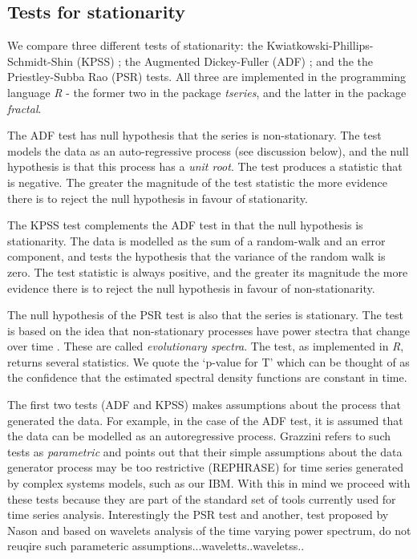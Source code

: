 \subsection{Tests for stationarity}
\label{sec:stat_tests}

We compare three different tests of stationarity: the Kwiatkowski-Phillips-Schmidt-Shin (KPSS) \cite{kwiatkowski1992testing}; the Augmented Dickey-Fuller (ADF) \cite{said1984testing}; and the the Priestley-Subba Rao (PSR) \cite{priestley1969test} tests. All three are implemented in the programming language \emph{R} \cite{Rlanguage} - the former two in the package \emph{tseries}, and the latter in the package \emph{fractal}.

The ADF test has null hypothesis that the series is non-stationary. The test models the data as an auto-regressive process (see discussion below), and the null hypothesis is that this process has a \emph{unit root}. The test produces a statistic that is negative. The greater the magnitude of the test statistic the more evidence there is to reject the null hypothesis in favour of stationarity.

The KPSS test complements the ADF test in that the null hypothesis is stationarity. The data is modelled as the sum of a random-walk and an error component, and tests the hypothesis that the variance of the random walk is zero. The test statistic is always positive, and the greater its magnitude the more evidence there is to reject the null hypothesis in favour of non-stationarity.

The null hypothesis of the PSR test is also that the series is stationary. The test is based on the idea that non-stationary processes have power stectra that change over time \cite{priestley1969test}. These are called \emph{evolutionary spectra}. The test, as implemented in \emph{R}, returns several statistics. We quote the `p-value for T' which can be thought of as the confidence that the estimated spectral density functions are constant in time.

The first two tests (ADF and KPSS) makes assumptions about the process that generated the data. For example, in the case of the ADF test, it is assumed that the data can be modelled as an autoregressive process. Grazzini \cite{grazzini2012analysis} refers to such tests as \emph{parametric} and points out that their simple assumptions about the data generator process may be too restrictive (REPHRASE) for time series generated by complex systems models, such as our IBM.  With this in mind we proceed with these tests because they are part of the standard set of tools currently used for time series analysis. Interestingly the PSR test and another, test proposed by Nason \cite{nason2013test} and based on wavelets analysis of the time varying power spectrum, do not reuqire such parameteric assumptions...waveletts..waveletss..




